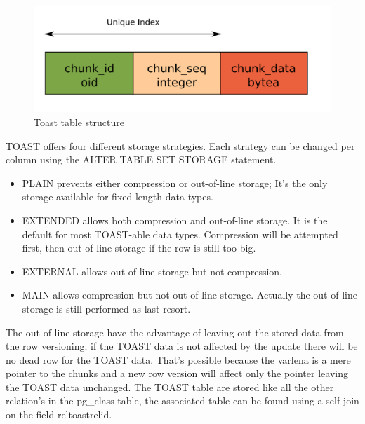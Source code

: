 \begin{figure}[H]
\begin{center}

\includegraphics[scale=0.55]{images/toast_01.png}

\caption{Toast table structure}
\label{fig:TOAST01} 
\end{center}

\end{figure}

TOAST offers four different storage strategies. Each strategy can be changed per column using the  
ALTER TABLE SET STORAGE statement.
\begin{itemize}
 


\item     PLAIN prevents either compression or out-of-line storage; It's the only storage available 
for fixed length data types.

\item     EXTENDED allows both compression and out-of-line storage. It is the default for most 
TOAST-able data types. Compression will be attempted first, then out-of-line storage if the row is 
still too big.

\item     EXTERNAL allows out-of-line storage but not compression. 

\item     MAIN allows compression but not out-of-line storage. Actually the out-of-line storage is 
still performed as last resort.

\end{itemize}

The out of line storage have the advantage of leaving out the 
stored data from the row versioning; if the TOAST data is not affected by the update there will be 
no dead row for the TOAST data. That's possible because the varlena is a mere pointer to the chunks 
and a new row version will affect only the pointer leaving the TOAST data unchanged.\newline
The TOAST table are stored like all the other relation's in the pg\_class table, the associated 
table can be found using a self join on the field reltoastrelid.\newline


